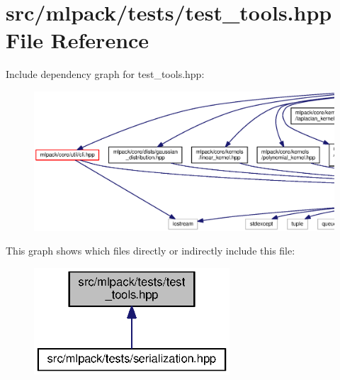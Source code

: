 \section{src/mlpack/tests/test\+\_\+tools.hpp File Reference}
\label{test__tools_8hpp}
Include dependency graph for test\+\_\+tools.\+hpp\+:
\nopagebreak
\begin{figure}[H]
\begin{center}
\leavevmode
\includegraphics[width=350pt]{test__tools_8hpp__incl}
\end{center}
\end{figure}
This graph shows which files directly or indirectly include this file\+:
\nopagebreak
\begin{figure}[H]
\begin{center}
\leavevmode
\includegraphics[width=207pt]{test__tools_8hpp__dep__incl}
\end{center}
\end{figure}
